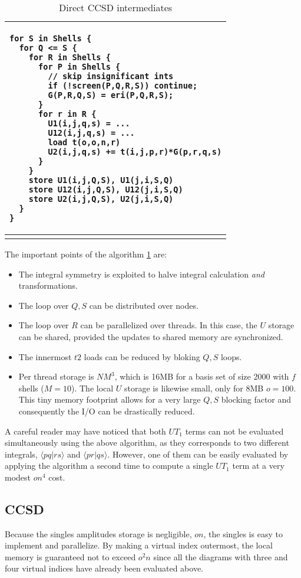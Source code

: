 \documentclass[12pt]{article} \usepackage[margin=1in]{geometry}
\newcommand{\braket}[2]{\langle #1|#2\rangle}
\newenvironment{listing}%
               {\begin{table}
                   \begin{tabular}{ p{6in} }
                     \hline}%
               {\end{tabular}%
               \end{table}}
\begin{document}
\begin {listing}
\begin {verbatim}
for S in Shells {
  for Q <= S {
    for R in Shells {
      for P in Shells {
        // skip insignificant ints
        if (!screen(P,Q,R,S)) continue;
        G(P,R,Q,S) = eri(P,Q,R,S);
      }
      for r in R {
        U1(i,j,q,s) = ...
        U12(i,j,q,s) = ...
        load t(o,o,n,r)
        U2(i,j,q,s) += t(i,j,p,r)*G(p,r,q,s)
      }
    }
    store U1(i,j,Q,S), U1(j,i,S,Q)
    store U12(i,j,Q,S), U12(j,i,S,Q)
    store U2(i,j,Q,S), U2(j,i,S,Q)
  }
}
\end{verbatim} \\
\hline
\caption{Direct CCSD intermediates}
\label{direct}
\end{listing}

The important points of the algorithm \ref{direct} are:
\begin{itemize}
\item{The integral symmetry is exploited to halve integral calculation
     {\it and} transformations.}
\item{The loop over $Q,S$ can be distributed over nodes.}
\item{The loop over $R$ can be parallelized over threads.  In this
    case, the $U$ storage can be shared, provided the updates  to
    shared memory are synchronized.}
\item{The  innermost $t2$ loads can be reduced by bloking $Q,S$ loops.}
\item{Per thread storage is $NM^3$, which is 16MB for a basis set of
    size 2000 with $f$ shells ($M = 10$). The local $U$ storage is
    likewise small, only for 8MB $o=100$.  This tiny memory footprint
    allows for a very large $Q,S$ blocking factor and consequently the
    I/O can be drastically reduced.}
\end{itemize}

A careful reader may have noticed that both $UT_1$ terms can not be
evaluated simultaneously using the above algorithm, as they
corresponds to two different integrals, $\braket{pq}{rs}$ and
$\braket{pr}{qs}$.  However, one of them can be easily evaluated by
applying the algorithm a second time to compute a single $UT_1$ term
at a very modest $on^4$ cost.

\subsection{CCSD}
Because the singles amplitudes storage is negligible, $on$, the
singles is easy to implement and parallelize.  By making a virtual
index outermost, the local memory is guaranteed not to exceed $o^2n$
since all the diagrams with  three and four virtual indices have
already been evaluated above.
\end{document}
